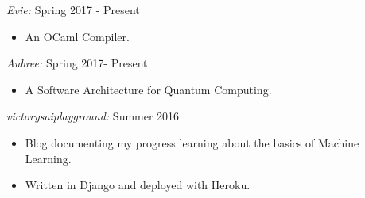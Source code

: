 \documentclass[margin, 10pt]{res} %
\begin{document}
\begin{resume}
        {\sl Evie:} \hfill Spring 2017 - Present

        \begin{itemize}
        \item An OCaml Compiler.\\

          \end{itemize}
        {\sl Aubree:} \hfill Spring 2017- Present
        \begin{itemize}
          
        \item A Software Architecture for Quantum Computing.\\

        \end{itemize}

        {\sl victorysaiplayground:} \hfill Summer 2016
        \begin{itemize}
          
        \item Blog documenting my progress learning about the basics of Machine Learning.\\
          \item Written in Django and deployed with Heroku.

          \end{itemize}
 


\end{resume}
\end{document}
